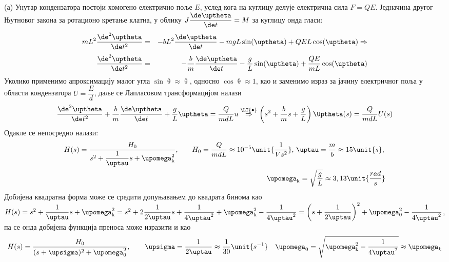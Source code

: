 \RESENJE
(а) Унутар кондензатора постоји хомогено електрично поље $E$, услед кога на куглицу 
делује електрична сила $F = QE$.
Једначина другог Њутновог закона за ротационо кретање клатна, у облику $J \dfrac{\de\uptheta}{\de t} = M$ за
куглицу онда гласи:
\begin{eqnarray} 
    mL^2 \dfrac{\de^2 \uptheta}{\de t^2} &=& - b L^2 \dfrac{\de \uptheta}{\de t} - mgL\sin(\uptheta) + QE L\cos(\uptheta) \Rightarrow \\[1mm]
    \dfrac{\de^2 \uptheta}{\de t^2} &=& - \dfrac{b}{m}  \dfrac{\de \uptheta}{\de t} - \dfrac{g}{L} \sin(\uptheta) + \dfrac{QE}{mL}\cos(\uptheta)
\end{eqnarray}
Уколико применимо апроксимацију малог угла $\sin\uptheta \approx \uptheta$, односно $\cos \uptheta \approx 1$, као и заменимо 
израз за јачину електричног поља у области кондензатора $U = \dfrac{E}{d}$, даље се Лапласовом трансформацијом налази 
\begin{eqnarray}
    \dfrac{\de^2 \uptheta}{\de t^2} + \dfrac{b}{m}  \dfrac{\de \uptheta}{\de t} + \dfrac{g}{L} \uptheta =  \dfrac{Q}{mdL} u
    \overset{{\LT{\bullet}}}{ \Rightarrow } 
    \left(
        s^2 + \dfrac{b}{m} s +  \dfrac{g}{L}
    \right) \Uptheta(s) 
    =
    \dfrac{Q}{mdL} U(s)
\end{eqnarray}
Одакле се непосредно налази:
\begin{eqnarray}
    H(s) = \dfrac{ H_0 }{s^2 + \dfrac{1}{\uptau} s + \upomega_{\rm k}^2}, \quad && H_0 = \dfrac{Q}{mdL} \approx 10^{-5} \unit{\dfrac{1}{Vs^2}} ,\, \uptau = \dfrac{m}{b} 
    \approx 15\unit{s},\,  \\
    && \upomega_{\rm k} = \sqrt{\dfrac{g}{L}} \approx 3,13\unit{\dfrac{rad}{s}}
\end{eqnarray}
Добијена квадратна форма може се средити допуњавањем до квадрата бинома као 
$ H(s) = s^2 + \dfrac{1}{\uptau} s + \upomega_{\rm k}^2 = s^2 + 2 \dfrac{1}{2\uptau} s + \dfrac{1}{4\uptau^2} + \upomega_{\rm k}^2 - \dfrac{1}{4\uptau^2} 
= \left( s + \dfrac{1}{2\uptau} \right)^2 +  \upomega_0^2 - \dfrac{1}{4\uptau^2}$, па се онда добијена функција преноса може изразити и као 
\begin{eqnarray}
    H(s) = \dfrac{H_0}{(s + \upsigma)^2 + \upomega_0^2}, \qquad \upsigma = \dfrac{1}{2\uptau} \approx \dfrac{1}{30} \unit{s^{-1}} \quad \upomega_0 = \sqrt{\upomega_{\rm k}^2 - \dfrac{1}{4\uptau^2} }
    \approx \upomega_k
\end{eqnarray}

